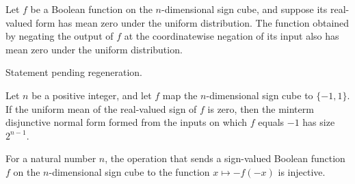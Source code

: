 \begin{theorem}
\label{FABL.isBalanced_booleanDual}
\leanok
{}
Let $f$ be a Boolean function on the $n$-dimensional sign cube, and suppose its
real-valued form has mean zero under the uniform distribution. The function obtained by
negating the output of $f$ at the coordinatewise negation of its input also has mean
zero under the uniform distribution.
\end{theorem}

\begin{theorem}
\label{FABL.uniformProbability_neg_one_eq_half_of_isBalanced}
\leanok
{}
Statement pending regeneration.
\end{theorem}

\begin{theorem}
\label{FABL.size_mintermDNF_of_isBalanced}
\leanok
{}
Let $n$ be a positive integer, and let $f$ map the $n$-dimensional sign cube to $\{
-1,1\}$. If the uniform mean of the real-valued sign of $f$ is zero, then the minterm
disjunctive normal form formed from the inputs on which $f$ equals $-1$ has size
$2^{n-1}$.
\end{theorem}

\begin{theorem}
\label{FABL.CNFFormula.booleanDual_injective}
\leanok
{}
For a natural number $n$, the operation that sends a sign-valued Boolean function $f$ on
the $n$-dimensional sign cube to the function $x\mapsto -f(-x)$ is injective.
\end{theorem}

